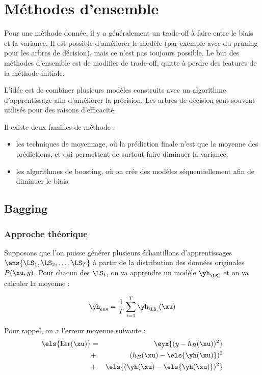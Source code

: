 \chapter{Méthodes d'ensemble}

Pour une méthode donnée, il y a généralement un trade-off à faire entre le biais et la variance. Il est possible d'améliorer le modèle (par exemple avec du pruning pour les arbres de décision), mais ce n'est pas toujours possible. Le but des méthodes d'ensemble est de modifier de trade-off, quitte à perdre des features de la méthode initiale.


L'idée est de combiner plusieurs modèles construits avec un algorithme d'apprentissage afin d'améliorer la précision. Les arbres de décision sont souvent utilisés pour des raisons d'efficacité.

Il existe deux familles de méthode :

\begin{itemize}
	\item les techniques de moyennage, où la prédiction finale n'est que la moyenne des prédictions, et qui permettent de surtout faire diminuer la variance.
	\item les algorithmes de boosting, où on crée des modèles séquentiellement afin de diminuer le biais.
\end{itemize}

\section{Bagging}

	\subsection{Approche théorique}
	Supposons que l'on puisse générer plusieurs échantillons d'apprentissages $\ens{\LS_1, \LS_2, \dots , \LS_T}$ à partir de la distribution des données originales $P(\xu, y)$. Pour chacun des $\LS_i$, on va apprendre un modèle $\yh_{\LS_i}$ et on va calculer la moyenne :
	
	$$\yh_{\text{ens}} = \frac{1}{T} \sum_{i = 1}^T \yh_{\LS_i}(\xu)$$
	
	Pour rappel, on a l'erreur moyenne suivante :
	\begin{eqnarray*}
	\els{\text{Err}(\xu)} & = & \eyx{(y - h_B(\xu))^2} \\
	 & + & (h_B(\xu) - \els{\yh(\xu)})^2 \\
	 & + & \els{(\yh(\xu) - \els{\yh(\xu)})^2}
	\end{eqnarray*}
	
